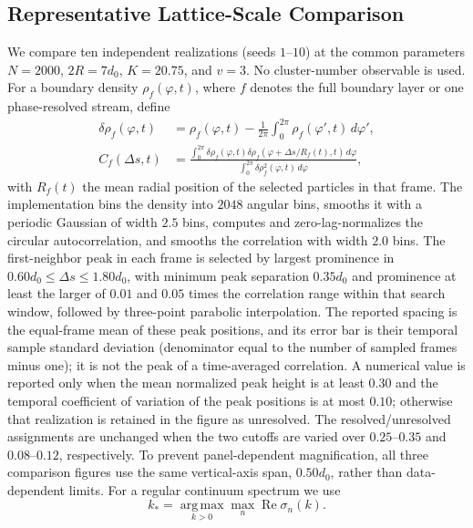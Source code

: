 \documentclass[11pt]{article}
\numberwithin{equation}{section}
\begin{document}
\subsection{Representative Lattice-Scale Comparison}

We compare ten independent realizations (seeds $1$--$10$) at the common
parameters $N=2000$, $2R=7d_0$, $K=20.75$, and $v=3$.  No cluster-number
observable is used.  For a boundary density $\rho_f(\varphi,t)$, where $f$
denotes the full boundary layer or one phase-resolved stream, define
\begin{align}
 \delta\rho_f(\varphi,t)
 &=\rho_f(\varphi,t)-\frac{1}{2\pi}
   \int_0^{2\pi}\rho_f(\varphi',t)\,d\varphi',\\
 C_f(\Delta s,t)
 &=\frac{\int_0^{2\pi}
   \delta\rho_f(\varphi,t)
   \delta\rho_f(\varphi+\Delta s/R_f(t),t)\,d\varphi}
 {\int_0^{2\pi}\delta\rho_f^2(\varphi,t)\,d\varphi},
 \label{eq:boundary_density_correlation}
\end{align}
with $R_f(t)$ the mean radial position of the selected particles in that frame.
The implementation bins the density into $2048$ angular bins, smooths it
with a periodic Gaussian of width $2.5$ bins, computes and zero-lag-normalizes
the circular autocorrelation, and smooths the correlation with width $2.0$ bins.
The first-neighbor peak in each frame is selected by largest prominence in
$0.60d_0\leq\Delta s\leq1.80d_0$, with minimum peak separation $0.35d_0$
and prominence at least the larger of $0.01$ and $0.05$ times the correlation
range within that search window, followed by three-point parabolic interpolation.
The reported spacing is the equal-frame mean of these peak positions, and
its error bar is their temporal sample standard deviation (denominator equal
to the number of sampled frames minus one);
it is not the peak of a time-averaged correlation. A numerical value is
reported only when the mean normalized peak height is at least $0.30$ and the
temporal coefficient of variation of the peak positions is at most $0.10$; otherwise that realization
is retained in the figure as unresolved.  The resolved/unresolved assignments
are unchanged when the two cutoffs are varied over $0.25$--$0.35$ and
$0.08$--$0.12$, respectively.  To prevent panel-dependent magnification, all
three comparison figures use the same vertical-axis span, $0.50d_0$, rather
than data-dependent limits.  For a regular continuum spectrum we use
\begin{equation}
  k_\ast=\underset{k>0}{\operatorname{arg\,max}}
  \max_n\operatorname{Re}\sigma_n(k) .
  \label{eq:lattice_scale_kstar}
\end{equation}
\end{document}
